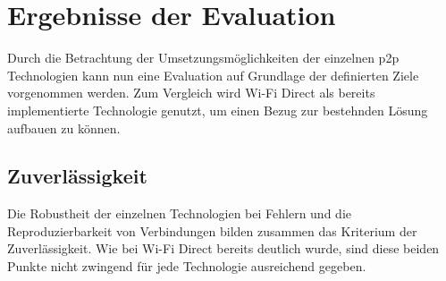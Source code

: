 \section{Ergebnisse der Evaluation}
		Durch die Betrachtung der Umsetzungsmöglichkeiten der einzelnen p2p Technologien kann nun eine Evaluation auf Grundlage der definierten Ziele vorgenommen werden. Zum Vergleich wird Wi-Fi Direct als bereits implementierte Technologie genutzt, um einen Bezug zur bestehnden Lösung aufbauen zu können.
		\subsection{Zuverlässigkeit}
		Die Robustheit der einzelnen Technologien bei Fehlern und die Reproduzierbarkeit von Verbindungen bilden zusammen das Kriterium der Zuverlässigkeit. Wie bei Wi-Fi Direct bereits deutlich wurde, sind diese beiden Punkte nicht zwingend für jede Technologie ausreichend gegeben. 
